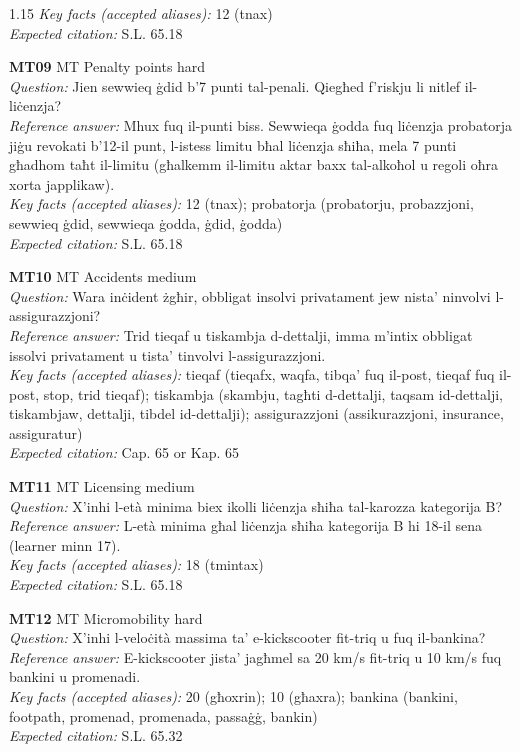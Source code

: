 \begin{spacing}{1.15}
\textit{Key facts (accepted aliases):} 12 (tnax) \\
\textit{Expected citation:} S.L. 65.18
\par\vspace{5pt}
\noindent\textbf{MT09} \quad MT \quad Penalty points \quad hard \\
\textit{Question:} Jien sewwieq ġdid b'7 punti tal-penali. Qiegħed f'riskju li nitlef il-liċenzja? \\
\textit{Reference answer:} Mhux fuq il-punti biss. Sewwieqa ġodda fuq liċenzja probatorja jiġu revokati b'12-il punt, l-istess limitu bħal liċenzja sħiħa, mela 7 punti għadhom taħt il-limitu (għalkemm il-limitu aktar baxx tal-alkoħol u regoli oħra xorta japplikaw). \\
\textit{Key facts (accepted aliases):} 12 (tnax); probatorja (probatorju, probazzjoni, sewwieq ġdid, sewwieqa ġodda, ġdid, ġodda) \\
\textit{Expected citation:} S.L. 65.18
\par\vspace{5pt}
\noindent\textbf{MT10} \quad MT \quad Accidents \quad medium \\
\textit{Question:} Wara inċident żgħir, obbligat insolvi privatament jew nista' ninvolvi l-assigurazzjoni? \\
\textit{Reference answer:} Trid tieqaf u tiskambja d-dettalji, imma m'intix obbligat issolvi privatament u tista' tinvolvi l-assigurazzjoni. \\
\textit{Key facts (accepted aliases):} tieqaf (tieqafx, waqfa, tibqa' fuq il-post, tieqaf fuq il-post, stop, trid tieqaf); tiskambja (skambju, tagħti d-dettalji, taqsam id-dettalji, tiskambjaw, dettalji, tibdel id-dettalji); assigurazzjoni (assikurazzjoni, insurance, assiguratur) \\
\textit{Expected citation:} Cap. 65 or Kap. 65
\par\vspace{5pt}
\noindent\textbf{MT11} \quad MT \quad Licensing \quad medium \\
\textit{Question:} X'inhi l-età minima biex ikolli liċenzja sħiħa tal-karozza kategorija B? \\
\textit{Reference answer:} L-età minima għal liċenzja sħiħa kategorija B hi 18-il sena (learner minn 17). \\
\textit{Key facts (accepted aliases):} 18 (tmintax) \\
\textit{Expected citation:} S.L. 65.18
\par\vspace{5pt}
\noindent\textbf{MT12} \quad MT \quad Micromobility \quad hard \\
\textit{Question:} X'inhi l-veloċità massima ta' e-kickscooter fit-triq u fuq il-bankina? \\
\textit{Reference answer:} E-kickscooter jista' jagħmel sa 20 km/s fit-triq u 10 km/s fuq bankini u promenadi. \\
\textit{Key facts (accepted aliases):} 20 (għoxrin); 10 (għaxra); bankina (bankini, footpath, promenad, promenada, passaġġ, bankin) \\
\textit{Expected citation:} S.L. 65.32
\par\vspace{5pt}
\end{spacing}
